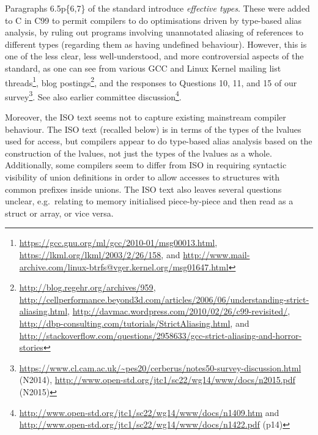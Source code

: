 \documentclass[12pt,acmsmall,review,screen]{acmart}\settopmatter{printfolios=true,printccs=false,printacmref=false}
\begin{document}
Paragraphs 6.5p\{6,7\} of the standard introduce \emph{effective
  types}. 
These were added to C in C99 to 
permit compilers to do optimisations driven by type-based alias
analysis, by ruling out programs involving unannotated aliasing of
references to different types (regarding them as having undefined
behaviour). 
However, this is one of the less clear, less well-understood, and more controversial aspects of the
standard, as one can see from 
various
GCC and Linux Kernel mailing list threads\footnote{\url{https://gcc.gnu.org/ml/gcc/2010-01/msg00013.html},
\url{https://lkml.org/lkml/2003/2/26/158}, and
\url{http://www.mail-archive.com/linux-btrfs@vger.kernel.org/msg01647.html}},
 blog postings\footnote{
\url{http://blog.regehr.org/archives/959},
\url{http://cellperformance.beyond3d.com/articles/2006/06/understanding-strict-aliasing.html},
\url{http://davmac.wordpress.com/2010/02/26/c99-revisited/},
\url{http://dbp-consulting.com/tutorials/StrictAliasing.html}, and
\url{http://stackoverflow.com/questions/2958633/gcc-strict-aliasing-and-horror-stories}},
 and the responses to Questions 10, 11, and 15 of our
 survey\footnote{\url{https://www.cl.cam.ac.uk/~pes20/cerberus/notes50-survey-discussion.html}
   (N2014),
   \url{http://www.open-std.org/jtc1/sc22/wg14/www/docs/n2015.pdf} (N2015)}.
See also earlier committee discussion\footnote{\url{http://www.open-std.org/jtc1/sc22/wg14/www/docs/n1409.htm} and \url{http://www.open-std.org/jtc1/sc22/wg14/www/docs/n1422.pdf} (p14)}. 


Moreover, the ISO text seems not to capture existing mainstream
compiler behaviour.  The ISO text (recalled below) is in terms of the
types of the lvalues used for access, but compilers appear to do
type-based alias analysis based on the construction of the lvalues,
not just the types of the lvalues as a whole.  Additionally, some
compilers seem to differ from ISO in requiring syntactic visibility of
union definitions in order to allow accesses to structures with common
prefixes inside unions.  The ISO text also leaves several questions
unclear, e.g.~relating to memory initialised piece-by-piece and then
read as a struct or array, or vice versa.

%
%
\end{document}
